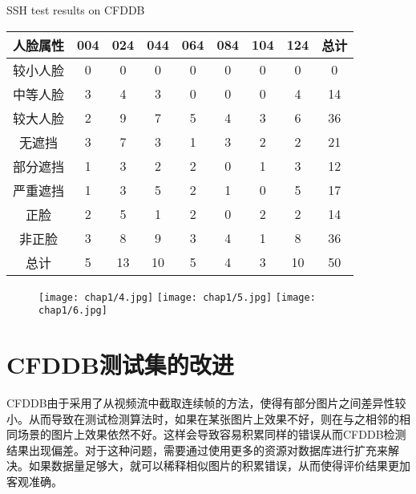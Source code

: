 \begin{table}[!hpb]
	\centering
	{SSH test results on CFDDB}
	\label{tab:cfddbal}
	\begin{tabular}{ c | ccccccc | c }
		\hline
		人脸属性 & 004 & 024 & 044 & 064 & 084 & 104 & 124 & 总计\\
		\hline
		较小人脸 & 0 & 0 & 0 & 0 & 0 & 0 & 0 & 0\\
		中等人脸 & 3 & 4 & 3 & 0 & 0 & 0 & 4 & 14\\
		较大人脸 & 2 & 9 & 7 & 5 & 4 & 3 & 6 & 36\\
		无遮挡   & 3 & 7 & 3 & 1 & 3 & 2 & 2 & 21\\
		部分遮挡 & 1 & 3 & 2 & 2 & 0 & 1 & 3 & 12\\
		严重遮挡 & 1 & 3 & 5 & 2 & 1 & 0 & 5 & 17\\
		正脸     & 2 & 5 & 1 & 2 & 0 & 2 & 2 & 14\\
		非正脸   & 3 & 8 & 9 & 3 & 4 & 1 & 8 & 36\\
		\hline
		总计 & 5 & 13 & 10 & 5 & 4 & 3 & 10 & 50\\
		\hline
	\end{tabular}
\end{table}

\begin{figure}[!htp]
	\centering
	{\texttt{[image: chap1/4.jpg]}}
	\hspace{4em}
	{\texttt{[image: chap1/5.jpg]}}
	\hspace{4em}
	{\texttt{[image: chap1/6.jpg]}}
	\label{fig:cfddbeval}
\end{figure}

\section{CFDDB测试集的改进}

CFDDB由于采用了从视频流中截取连续帧的方法，使得有部分图片之间差异性较小。从而导致在测试检测算法时，如果在某张图片上效果不好，则在与之相邻的相同场景的图片上效果依然不好。这样会导致容易积累同样的错误从而CFDDB检测结果出现偏差。对于这种问题，需要通过使用更多的资源对数据库进行扩充来解决。如果数据量足够大，就可以稀释相似图片的积累错误，从而使得评价结果更加客观准确。

